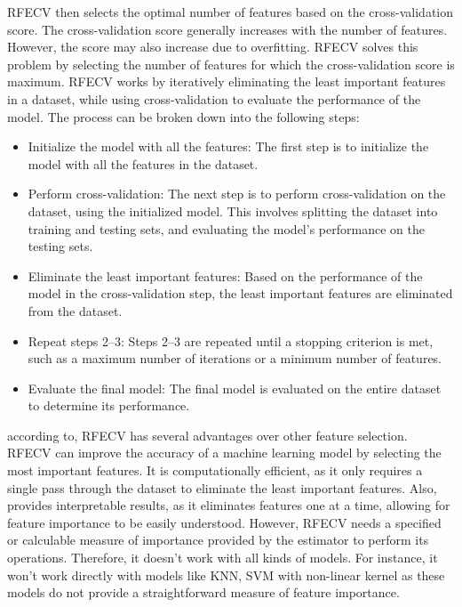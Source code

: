 \documentclass[12pt]{report}
\begin{document}
RFECV then selects the optimal number of features based on the cross-validation
score. The cross-validation score generally increases with the number of
features. However, the score may also increase due to overfitting. RFECV solves
this problem by selecting the number of features for which the cross-validation
score is maximum. RFECV works by iteratively eliminating the least important
features in a dataset, while using cross-validation to evaluate the performance
of the model. The process can be broken down into the following steps:

\begin{itemize}
    \item Initialize the model with all the features: The first step is to initialize the
          model with all the features in the dataset.
    \item Perform cross-validation: The next step is to perform cross-validation on the
          dataset, using the initialized model. This involves splitting the dataset into
          training and testing sets, and evaluating the model's performance on the
          testing sets.
    \item Eliminate the least important features: Based on the performance of the model
          in the cross-validation step, the least important features are eliminated from
          the dataset.
    \item Repeat steps 2--3: Steps 2--3 are repeated until a stopping criterion is met,
          such as a maximum number of iterations or a minimum number of features.
    \item Evaluate the final model: The final model is evaluated on the entire dataset to
          determine its performance.
\end{itemize}

according to\cite{10.3389/fbioe.2020.00496}, RFECV has several advantages over
other feature selection. RFECV can improve the accuracy of a machine learning
model by selecting the most important features. It is computationally
efficient, as it only requires a single pass through the dataset to eliminate
the least important features. Also, provides interpretable results, as it
eliminates features one at a time, allowing for feature importance to be easily
understood. However, RFECV needs a specified or calculable measure of
importance provided by the estimator to perform its operations. Therefore, it
doesn't work with all kinds of models. For instance, it won't work directly
with models like KNN, SVM with non-linear kernel as these models do not provide
a straightforward measure of feature importance.\newpage
\end{document}
